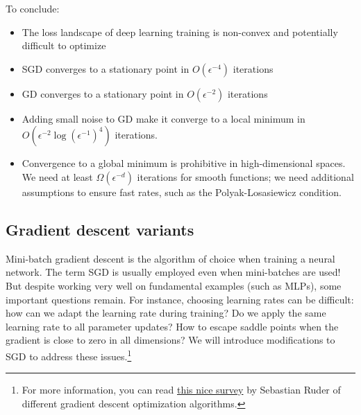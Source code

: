 To conclude:
\begin{itemize}
    \item The loss landscape of deep learning training is non-convex and potentially difficult to optimize
    \item SGD converges to a stationary point in $O(\epsilon^{-4})$ iterations
    \item GD converges to a stationary point in $O(\epsilon^{-2})$ iterations
    \item Adding small noise to GD make it converge to a local minimum in $O(\epsilon^{-2}\log(\epsilon^{-1})^4)$ iterations.
    \item Convergence to a global minimum is prohibitive in high-dimensional spaces. We need at least $\Omega(\epsilon^{-d})$ iterations for smooth functions; we need additional assumptions to ensure fast rates, such as the Polyak-Losasiewicz condition.
\end{itemize}

\subsection{Gradient descent variants}
Mini-batch gradient descent is the algorithm of choice when training a neural network. The term SGD is usually employed even when mini-batches are used! But despite working very well on fundamental examples (such as MLPs), some important questions remain. For instance, choosing learning rates can be difficult: how can we adapt the learning rate during training? Do we apply the same learning rate to all parameter updates? How to escape saddle points when the gradient is close to zero in all dimensions? We will introduce modifications to SGD to address these issues.\footnote{For more information, you can read \href{https://www.ruder.io/optimizing-gradient-descent/}{this nice survey} by Sebastian Ruder of different gradient descent optimization algorithms.}

